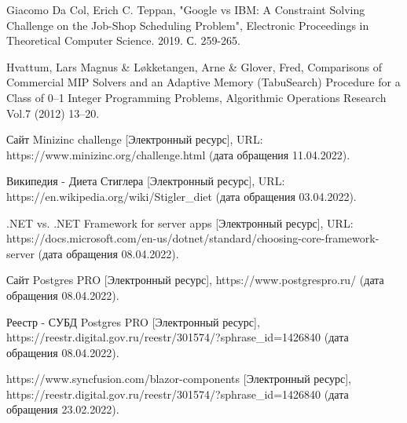 \begin{thebibliography}{00}
	
    Giacomo Da Col, Erich C. Teppan,
    "Google vs IBM: A Constraint Solving Challenge on the Job-Shop Scheduling Problem",
    Electronic Proceedings in Theoretical Computer Science. 2019. С. 259-265.
    
    Hvattum, Lars Magnus \& Løkketangen, Arne \& Glover, Fred,
    Comparisons of Commercial MIP Solvers and an Adaptive Memory (TabuSearch) Procedure for a Class of 0–1 Integer Programming Problems,
    Algorithmic Operations Research Vol.7 (2012) 13–20.
    
    Сайт Minizinc challenge
    [Электронный ресурс],
    URL: https://www.minizinc.org/challenge.html
    (дата обращения 11.04.2022).
    
    Википедия - Диета Стиглера
    [Электронный ресурс],
    URL: https://en.wikipedia.org/wiki/Stigler\_diet
    (дата обращения 03.04.2022).
    
    .NET vs. .NET Framework for server apps
    [Электронный ресурс],
    URL: https://docs.microsoft.com/en-us/dotnet/standard/choosing-core-framework-server
    (дата обращения 08.04.2022).
    
    Сайт Postgres PRO
    [Электронный ресурс],
    https://www.postgrespro.ru/
    (дата обращения 08.04.2022).
	
    Реестр - СУБД Postgres PRO
    [Электронный ресурс],
    https://reestr.digital.gov.ru/reestr/301574/?sphrase\_id=1426840
    (дата обращения 08.04.2022).	

    https://www.syncfusion.com/blazor-components
    [Электронный ресурс],
    https://reestr.digital.gov.ru/reestr/301574/?sphrase\_id=1426840
    (дата обращения 23.02.2022).		
	

\end{thebibliography}
\endgroup

\clearpage
